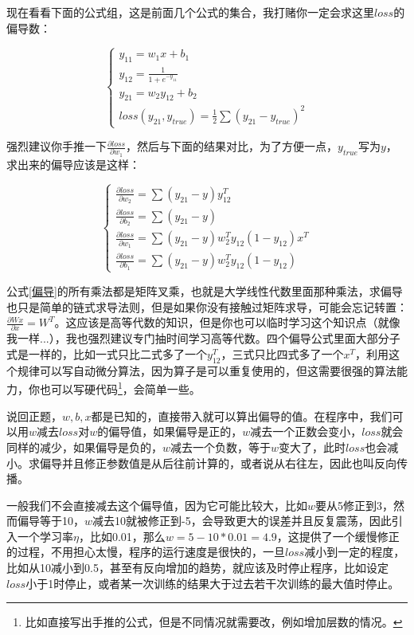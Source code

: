 \documentclass[a5paper, 11pt, openany]{book}
\begin{document}
现在看看下面的公式组，这是前面几个公式的集合，我打赌你一定会求这里$loss$的偏导数：

\begin{equation}
    \begin{cases}
        y_{11} = w_1x+b_1 \\
        y_{12} = \frac{1}{1+e^{-y_{11}}} \\
        y_{21} = w_2y_{12} + b_2 \\
        loss(y_{21}, y_{true}) = \frac{1}{2}\sum(y_{21} - y_{true})^2
    \end{cases}
\end{equation}

强烈建议你手推一下$\frac{\partial{loss}}{\partial{w_1}}$，然后与下面的结果对比，为了方便一点，$y_{true}$写为$y$，求出来的偏导应该是这样：

\begin{equation}\label{偏导}
    \begin{cases}
        \frac{\partial{loss}}{\partial{w_2}} = \sum(y_{21}-y)y_{12}^T \\
        \frac{\partial{loss}}{\partial{b_2}} = \sum(y_{21}-y) \\
        \frac{\partial{loss}}{\partial{w_1}} = \sum(y_{21}-y)w_2^Ty_{12}(1-y_{12})x^T \\
        \frac{\partial{loss}}{\partial{b_1}} = \sum(y_{21}-y)w_2^Ty_{12}(1-y_{12})
    \end{cases}
\end{equation}

公式\ref{偏导}的所有乘法都是矩阵叉乘，也就是大学线性代数里面那种乘法，求偏导也只是简单的链式求导法则，但是如果你没有接触过矩阵求导，可能会忘记转置：$\frac{\partial{Wx}}{\partial{x}}=W^T$。这应该是高等代数的知识，但是你也可以临时学习这个知识点（就像我一样...），我也强烈建议专门抽时间学习高等代数。四个偏导公式里面大部分子式是一样的，比如一式只比二式多了一个$y_{12}^T$，三式只比四式多了一个$x^T$，利用这个规律可以写自动微分算法，因为算子是可以重复使用的，但这需要很强的算法能力，你也可以写硬代码\footnote{\label{硬代码解释}比如直接写出手推的公式，但是不同情况就需要改，例如增加层数的情况。}，会简单一些。

说回正题，$w, b, x$都是已知的，直接带入就可以算出偏导的值。在程序中，我们可以用$w$减去$loss$对$w$的偏导值，如果偏导是正的，$w$减去一个正数会变小，$loss$就会同样的减少，如果偏导是负的，$w$减去一个负数，等于$w$变大了，此时$loss$也会减小。求偏导并且修正参数值是从后往前计算的，或者说从右往左，因此也叫反向传播。

一般我们不会直接减去这个偏导值，因为它可能比较大，比如$w$要从5修正到3，然而偏导等于10，$w$减去10就被修正到-5，会导致更大的误差并且反复震荡，因此引入一个学习率$\eta$，比如0.01，那么$w=5-10*0.01=4.9$，这提供了一个缓慢修正的过程，不用担心太慢，程序的运行速度是很快的，一旦$loss$减小到一定的程度，比如从10减小到0.5，甚至有反向增加的趋势，就应该及时停止程序，比如设定$loss$小于1时停止，或者某一次训练的结果大于过去若干次训练的最大值时停止。
\end{document}

